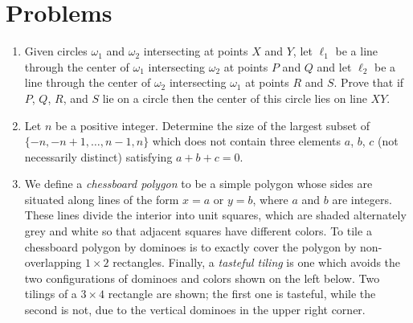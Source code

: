 \documentclass[11pt]{scrartcl}
\begin{document}
\section{Problems}
\begin{enumerate}[\bfseries 1.]
\item %
Given circles $\omega_1$ and $\omega_2$ intersecting at points $X$ and $Y$,
let $\ell_1$ be a line through the center of $\omega_1$
intersecting $\omega_2$ at points $P$ and $Q$
and let $\ell_2$ be a line through the center of $\omega_2$
intersecting $\omega_1$ at points $R$ and $S$.
Prove that if $P$, $Q$, $R$, and $S$ lie on a circle
then the center of this circle lies on line $XY$.

\item %
Let $n$ be a positive integer.
Determine the size of the largest subset of $\{ -n, -n+1, \dots, n-1, n\}$
which does not contain three elements $a$, $b$, $c$ (not necessarily distinct)
satisfying $a+b+c=0$.

\item %
We define a \emph{chessboard polygon} to be a simple polygon whose sides are
situated along lines of the form $x=a$ or $y=b$, where $a$ and $b$ are integers.
These lines divide the interior into unit squares, which are shaded alternately
grey and white so that adjacent squares have different colors.
To tile a chessboard polygon by dominoes is to
exactly cover the polygon by non-overlapping $ 1 \times 2$ rectangles.
Finally, a \emph{tasteful tiling} is one which avoids the
two configurations of dominoes and colors shown on the left below.
Two tilings of a $3 \times 4$ rectangle are shown;
the first one is tasteful, while the second is not,
due to the vertical dominoes in the upper right corner.

\begin{center}
\end{center}


\end{enumerate}
\end{document}
